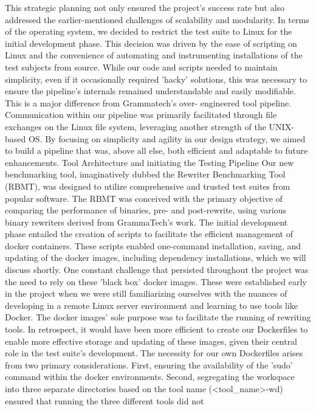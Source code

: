 \documentclass[a4paper,11pt,oneside]{report}
\begin{document}
This strategic planning not only ensured the project's success rate but also addressed the
earlier-mentioned challenges of scalability and modularity.
In terms of the operating system, we decided to restrict the test suite to Linux for
the initial development phase. This decision was driven by the ease of scripting on Linux and
the convenience of automating and instrumenting installations of the test subjects from
source. While our code and scripts needed to maintain simplicity, even if it occasionally
required 'hacky' solutions, this was necessary to ensure the pipeline's internals remained
understandable and easily modifiable. This is a major difference from Grammatech’s over-
engineered tool pipeline.
Communication within our pipeline was primarily facilitated through file exchanges
on the Linux file system, leveraging another strength of the UNIX-based OS. By focusing on
simplicity and agility in our design strategy, we aimed to build a pipeline that was, above all
else, both efficient and adaptable to future enhancements.
Tool Architecture and initiating the Testing Pipeline
Our new benchmarking tool, imaginatively dubbed the Rewriter Benchmarking Tool
(RBMT), was designed to utilize comprehensive and trusted test suites from popular
software. The RBMT was conceived with the primary objective of comparing the
performance of binaries, pre- and post-rewrite, using various binary rewriters derived from
GrammaTech's work.
The initial development phase entailed the creation of scripts to facilitate the
efficient management of docker containers. These scripts enabled one-command
installation, saving, and updating of the docker images, including dependency installations,
which we will discuss shortly.
One constant challenge that persisted throughout the project was the need to rely
on these 'black box' docker images. These were established early in the project when we
were still familiarizing ourselves with the nuances of developing in a remote Linux server
environment and learning to use tools like Docker. The docker images' sole purpose was to
facilitate the running of rewriting tools.
In retrospect, it would have been more efficient to create our Dockerfiles to enable
more effective storage and updating of these images, given their central role in the test
suite's development. The necessity for our own Dockerfiles arises from two primary
considerations. First, ensuring the availability of the 'sudo' command within the docker
environments. Second, segregating the workspace into three separate directories based on
the tool name (\textless{}tool\_name\textgreater{}-wd) ensured that running the three different tools did not
\end{document}
